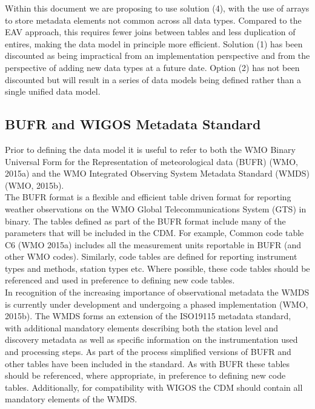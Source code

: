 \documentclass[a4paper]{article}
\begin{document}
Within this document we are proposing to use solution (4), with the use of arrays to store metadata elements not common across all data types. Compared to the EAV approach, this requires fewer joins between tables and less duplication of entires, making the data model in principle more efficient. Solution (1) has been discounted as being impractical from an implementation perspective and from the perspective of adding new data types at a future date. Option (2) has not been discounted but will result in a series of data models being defined rather than a single unified data model.\\



\subsection {BUFR and WIGOS Metadata Standard}
Prior to defining the data model it is useful to refer to both the WMO Binary Universal Form for the Representation of meteorological data (BUFR) (WMO, 2015a) and the WMO Integrated Observing System Metadata Standard (WMDS) (WMO, 2015b). \\

The BUFR format is a flexible and efficient table driven format for reporting weather observations on the WMO Global Telecommunications System (GTS) in binary. The tables defined as part of the BUFR format include many of the parameters that will be included in the CDM. For example, Common code table C6 (WMO 2015a) includes all the measurement units reportable in BUFR (and other WMO codes). Similarly, code tables are defined for reporting instrument types and methods, station types etc. Where possible, these code tables should be referenced and used in preference to defining new code tables.\\

In recognition of the increasing importance of observational metadata the WMDS is currently under development and undergoing a phased implementation (WMO, 2015b). The WMDS forms an extension of the ISO19115 metadata standard, with additional mandatory elements describing both the station level and discovery metadata as well as specific information on the instrumentation used and processing steps. As part of the process simplified versions of BUFR and other tables have been included in the standard. As with BUFR these tables should be referenced, where appropriate, in preference to defining new code tables. Additionally, for compatibility with WIGOS the CDM should contain all mandatory elements of the WMDS. 
\end{document}
